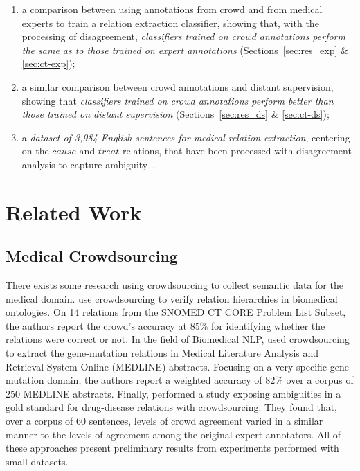 \begin{enumerate}

\item a comparison between using annotations from crowd and from medical experts to train a relation extraction classifier, showing that, with the processing of disagreement, \textit{classifiers trained on crowd annotations perform the same as to those trained on expert annotations} {\color{blue} (Sections~\ref{sec:res_exp} \& \ref{sec:ct-exp})};

\item a similar comparison between crowd annotations and distant supervision, showing that \textit{classifiers trained on crowd annotations perform better than those trained on distant supervision} {\color{blue} (Sections~\ref{sec:res_ds} \& \ref{sec:ct-ds})};

\item a \textit{dataset of 3,984 English sentences for medical relation extraction}, centering on the $cause$ and $treat$ relations, that have been processed with disagreement analysis to capture ambiguity~\cite{anca_dumitrache_2016_50676}.

\end{enumerate}


\section{Related Work}

\subsection{Medical Crowdsourcing}

There exists some research using crowdsourcing to collect semantic data for the medical domain. \citet{mortensen2013crowdsourcing} use crowdsourcing to verify relation hierarchies in biomedical ontologies. On 14 relations from the SNOMED CT CORE Problem List Subset, the authors report the crowd's accuracy at 85\% for identifying whether the relations were correct or not. In the field of Biomedical NLP, \citet{burger2012validating} used crowdsourcing to extract the gene-mutation relations in Medical Literature Analysis and Retrieval System Online (MEDLINE) abstracts. Focusing on a very specific gene-mutation domain, the authors report a weighted accuracy of 82\% over a corpus of 250 MEDLINE abstracts. Finally, \citet{li2015exposing} performed a study exposing ambiguities in a gold standard for drug-disease relations with crowdsourcing. They found that, over a corpus of 60 sentences, levels  of  crowd agreement varied in a similar manner to the levels of agreement  among  the  original  expert  annotators. All of these approaches present preliminary results from experiments performed with small datasets.

